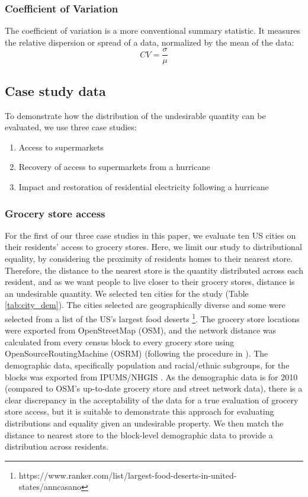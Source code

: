 \documentclass[final,3p,times,onecolumn,sort&compress]{elsarticle}
\begin{document}
\subsubsection{Coefficient of Variation}
The coefficient of variation is a more conventional summary statistic.
It measures the relative dispersion or spread of a data, normalized by the mean of the data: 
\begin{equation}
    CV = \frac{\sigma}{\mu}
\end{equation}

\subsection{Case study data}
To demonstrate how the distribution of the undesirable quantity can be evaluated, we use three case studies:
\begin{enumerate}
    \item Access to supermarkets
    \item Recovery of access to supermarkets from a hurricane
    \item Impact and restoration of residential electricity following a hurricane
\end{enumerate}

\subsubsection{Grocery store access}
For the first of our three case studies in this paper, we evaluate ten US cities on their residents' access to grocery stores.
Here, we limit our study to distributional equality, by considering the proximity of residents homes to their nearest store. 
Therefore, the distance to the nearest store is the quantity distributed across each resident, and as we want people to live closer to their grocery stores, distance is an undesirable quantity.
We selected ten cities for the study (Table \ref{tab:city_dem}).
The cities selected are geographically diverse and some were selected from a list of the US's largest food deserts \footnote{https://www.ranker.com/list/largest-food-deserts-in-united-states/anncasano}. 
The grocery store locations were exported from OpenStreetMap (OSM), and the network distance was calculated from every census block to every grocery store using OpenSourceRoutingMachine (OSRM) (following the procedure in \cite{Logan2019-fr}). 
The demographic data, specifically population and racial/ethnic subgroups, for the blocks was exported from IPUMS/NHGIS \citep{Manson2018-ug}.
As the demographic data is for 2010 (compared to OSM's up-to-date grocery store and street network data), there is a clear discrepancy in the acceptability of the data for a true evaluation of grocery store access, but it is suitable to demonstrate this approach for evaluating distributions and equality given an undesirable property. 
We then match the distance to nearest store to the block-level demographic data to provide a distribution across residents.
\end{document}
